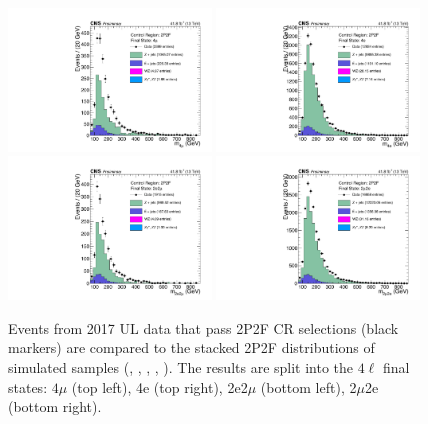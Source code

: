 \begin{figure}[!htbp]
	\begin{center}
		\includegraphics[width=0.48\textwidth]{figures/higgsmassmeas/redbkg/cr/UL2017_CR_2P2F_4mu.pdf}
		\includegraphics[width=0.48\textwidth]{figures/higgsmassmeas/redbkg/cr/UL2017_CR_2P2F_4e.pdf}
		\includegraphics[width=0.48\textwidth]{figures/higgsmassmeas/redbkg/cr/UL2017_CR_2P2F_2e2mu.pdf}
		\includegraphics[width=0.48\textwidth]{figures/higgsmassmeas/redbkg/cr/UL2017_CR_2P2F_2mu2e.pdf}
		\caption{
			Events from 2017 UL data that pass 2P2F CR selections (black markers) 
			are compared to the stacked 2P2F distributions of simulated samples
			(\Zplusjets, \ttbarplusjets, \WZ, \ZZ, \Zgammastar).
			The results are split into the $4\ell$ final states:
			$4\mu$ (top left), 4e (top right), 2e2$\mu$ (bottom left), 2$\mu$2e (bottom right).
		}
		\label{cr_plots_2p2f_2017}
	\end{center}
\end{figure}
